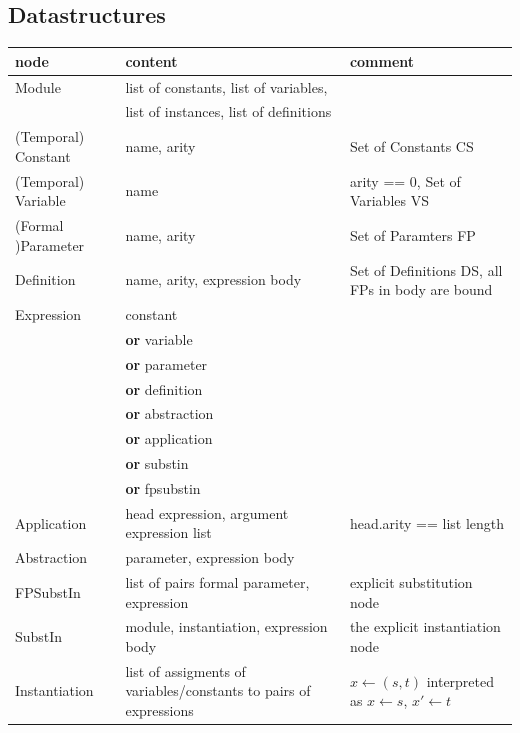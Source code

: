 \documentclass[a4paper]{article}
\newcommand{\dor}{\textbf{or}}
\newcommand{\iwith}{\leftarrow}
\theoremstyle{definition}
\begin{document}
\subsection{Datastructures}
\label{sec:ds}

\begin{tabular}{lp{}p{}}
  node & content & comment \\
  \hline
  Module & list of constants, list of variables, & \\
       & list of instances, list of definitions & \\
  (Temporal) Constant  & name, arity & Set of Constants CS \\
  (Temporal) Variable  & name & arity == 0, Set of Variables VS \\
  (Formal )Parameter & name, arity & Set of Paramters FP \\
  Definition & name, arity, expression body & Set of Definitions DS,
                                              all FPs in body are bound \\
  Expression  & constant    & \\
       & \dor{} variable    & \\
       & \dor{} parameter   & \\
       & \dor{} definition  & \\
       & \dor{} abstraction & \\
       & \dor{} application & \\
       & \dor{} substin     & \\
       & \dor{} fpsubstin   & \\
  Application & head expression, argument expression list
                 & head.arity == list length\\
  Abstraction & parameter, expression body & \\
  FPSubstIn  & list of pairs formal parameter, expression
                 & explicit substitution node \\
  SubstIn     & module, instantiation, expression body
                 & the explicit instantiation node \\
  Instantiation & list of assigments of variables/constants to pairs
                  of expressions & $x \iwith (s,t)$ interpreted as $x \iwith s$,
                                   $x' \iwith t$ \\
\end{tabular}
\end{document}
